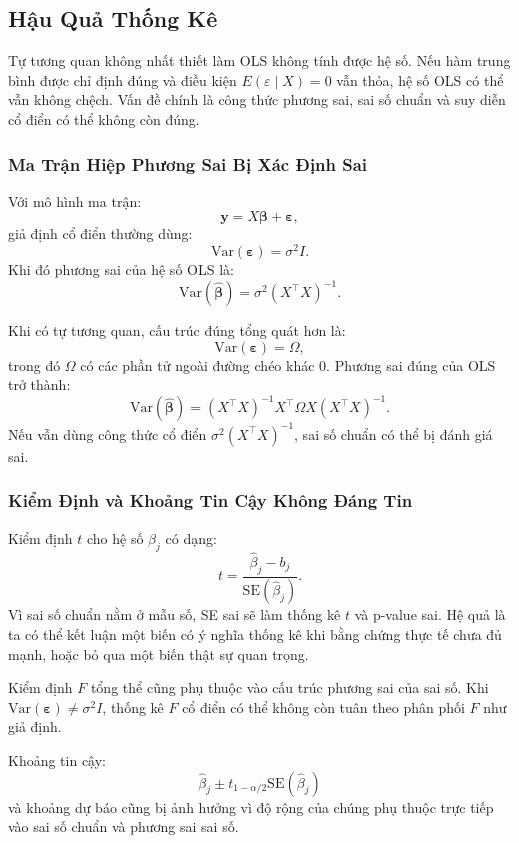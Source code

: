\subsection{Hậu Quả Thống Kê}

Tự tương quan không nhất thiết làm OLS không tính được hệ số. Nếu hàm trung bình được chỉ định đúng và điều kiện $E(\varepsilon\mid X)=0$ vẫn thỏa, hệ số OLS có thể vẫn không chệch. Vấn đề chính là công thức phương sai, sai số chuẩn và suy diễn cổ điển có thể không còn đúng.

\subsubsection{Ma Trận Hiệp Phương Sai Bị Xác Định Sai}

Với mô hình ma trận:
\[
  \mathbf{y}=X\boldsymbol{\beta}+\boldsymbol{\varepsilon},
\]
giả định cổ điển thường dùng:
\[
  \mathrm{Var}(\boldsymbol{\varepsilon})=\sigma^2 I.
\]
Khi đó phương sai của hệ số OLS là:
\[
  \mathrm{Var}(\hat{\boldsymbol{\beta}})=\sigma^2(X^\top X)^{-1}.
\]

Khi có tự tương quan, cấu trúc đúng tổng quát hơn là:
\[
  \mathrm{Var}(\boldsymbol{\varepsilon})=\Omega,
\]
trong đó $\Omega$ có các phần tử ngoài đường chéo khác $0$. Phương sai đúng của OLS trở thành:
\[
  \mathrm{Var}(\hat{\boldsymbol{\beta}})
  =
  (X^\top X)^{-1}X^\top\Omega X(X^\top X)^{-1}.
\]
Nếu vẫn dùng công thức cổ điển $\sigma^2(X^\top X)^{-1}$, sai số chuẩn có thể bị đánh giá sai.

\subsubsection{Kiểm Định và Khoảng Tin Cậy Không Đáng Tin}

Kiểm định $t$ cho hệ số $\beta_j$ có dạng:
\[
  t = \frac{\hat{\beta}_j-b_j}{\mathrm{SE}(\hat{\beta}_j)}.
\]
Vì sai số chuẩn nằm ở mẫu số, SE sai sẽ làm thống kê $t$ và p-value sai. Hệ quả là ta có thể kết luận một biến có ý nghĩa thống kê khi bằng chứng thực tế chưa đủ mạnh, hoặc bỏ qua một biến thật sự quan trọng.

Kiểm định $F$ tổng thể cũng phụ thuộc vào cấu trúc phương sai của sai số. Khi $\mathrm{Var}(\boldsymbol{\varepsilon})\neq\sigma^2 I$, thống kê $F$ cổ điển có thể không còn tuân theo phân phối $F$ như giả định.

Khoảng tin cậy:
\[
  \hat{\beta}_j \pm t_{1-\alpha/2}\mathrm{SE}(\hat{\beta}_j)
\]
và khoảng dự báo cũng bị ảnh hưởng vì độ rộng của chúng phụ thuộc trực tiếp vào sai số chuẩn và phương sai sai số.

